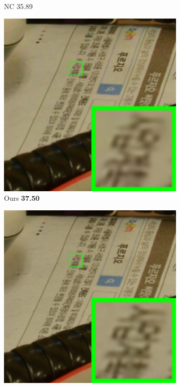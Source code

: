 \begin{figure}
\begin{subfigure}[t]{0.19\textwidth}
\caption{NC 35.89}
    \end{subfigure}
    \hfill
    \begin{subfigure}[t]{0.19\textwidth}
        \centering
        \includegraphics[width=1\textwidth]{images/guided/cc60/resize_br_Guided_CC_Noisy_Nikon_D800_ISO_3200_A1_111.png}
\caption{Ours \textbf{37.50}}
    \end{subfigure}
    \hfill
    \begin{subfigure}[t]{0.19\textwidth}
        \centering
        \includegraphics[width=1\textwidth]{images/guided/cc60/resize_br_Mean_CC_Noisy_Nikon_D800_ISO_3200_A1_111.png}

\end{subfigure}
\end{figure}
